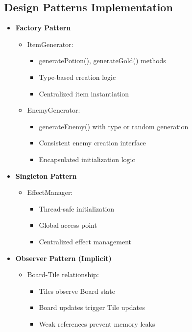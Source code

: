 \documentclass{article}
\begin{document}
\subsection{Design Patterns Implementation}
\begin{itemize}
    \item \textbf{Factory Pattern}
    \begin{itemize}
        \item ItemGenerator:
        \begin{itemize}
            \item generatePotion(), generateGold() methods
            \item Type-based creation logic
            \item Centralized item instantiation
        \end{itemize}
        \item EnemyGenerator:
        \begin{itemize}
            \item generateEnemy() with type or random generation
            \item Consistent enemy creation interface
            \item Encapsulated initialization logic
        \end{itemize}
    \end{itemize}

    \item \textbf{Singleton Pattern}
    \begin{itemize}
        \item EffectManager:
        \begin{itemize}
            \item Thread-safe initialization
            \item Global access point
            \item Centralized effect management
        \end{itemize}
    \end{itemize}

    \item \textbf{Observer Pattern (Implicit)}
    \begin{itemize}
        \item Board-Tile relationship:
        \begin{itemize}
            \item Tiles observe Board state
            \item Board updates trigger Tile updates
            \item Weak references prevent memory leaks
        \end{itemize}
    \end{itemize}
\end{itemize}
\end{document}
